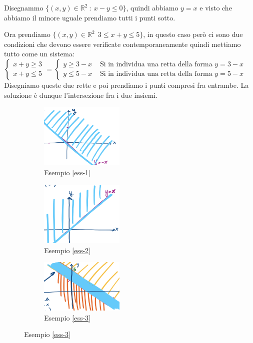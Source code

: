 \begin{example}\label{ess-2}
Disegnammo $\{(x,y) \in \mathbb{R}^2 \::\: x-y \leq 0 \}$, quindi abbiamo $y = x$ e visto che abbiamo il minore uguale prendiamo tutti i punti sotto.
\end{example}

\begin{example}\label{ess-3}
Ora prendiamo $\{(x,y) \in \mathbb{R}^2 \:\: 3 \leq x+y \leq 5\}$, in questo caso però ci sono due condizioni che devono essere verificate contemporaneamente quindi mettiamo tutto come un sistema:\\
$\begin{cases}x+y \geq 3 \\ x+y \leq 5\end{cases} = \begin{cases}y \geq 3-x & \text{ Si in individua una retta della forma } y=3-x \\ y \leq 5-x & \text{ Si in individua una retta della forma } y=5-x\end{cases}$\\
Disegniamo queste due rette e poi prendiamo i punti compresi fra entrambe. La soluzione è dunque l'intersezione fra i due insiemi.
\end{example}

\begin{figure}[h!]
\centering
\begin{subfigure}{.3\textwidth}
    \centering
    \includegraphics[width=4cm]{images/disegno-R3-ess1.png}
    \caption{Esempio \ref{ess-1}}
\end{subfigure}
\begin{subfigure}{.3\textwidth}
    \centering
    \includegraphics[width=4cm]{images/disegno-R3-ess2.png}
    \caption{Esempio \ref{ess-2}}
\end{subfigure}
\begin{subfigure}{.3\textwidth}
    \centering
    \includegraphics[width=4cm]{images/disegno-R3-ess3.png}
    \caption{Esempio \ref{ess-3}}
\end{subfigure}
\end{figure}

